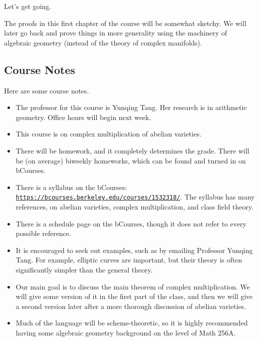 \documentclass[../notes.tex]{subfiles}
\begin{document}
Let's get going.
\begin{warn}
	The proofs in this first chapter of the course will be somewhat sketchy. We will later go back and prove things in more generality using the machinery of algebraic geometry (instead of the theory of complex manifolds).
\end{warn}

\subsection{Course Notes}
Here are some course notes.
\begin{itemize}
	\item The professor for this course is Yunqing Tang. Her research is in arithmetic geometry. Office hours will begin next week.
	\item This course is on complex multiplication of abelian varieties.
	\item There will be homework, and it completely determines the grade. There will be (on average) biweekly homeworks, which can be found and turned in on bCourses.
	\item There is a syllabus on the bCourses: \href{https://bcourses.berkeley.edu/courses/1532318/}{\texttt{https://bcourses.berkeley.edu/courses/1532318/}}. The syllabus has many references, on abelian varieties, complex multiplication, and class field theory.
	\item There is a schedule page on the bCourses, though it does not refer to every possible reference.
	\item It is encouraged to seek out examples, such as by emailing Professor Yunqing Tang. For example, elliptic curves are important, but their theory is often significantly simpler than the general theory.
	\item Our main goal is to discuss the main theorem of complex multiplication. We will give some version of it in the first part of the class, and then we will give a second version later after a more thorough discussion of abelian varieties.
	\item Much of the language will be scheme-theoretic, so it is highly recommended having some algebraic geometry background on the level of Math 256A.
\end{itemize}
\end{document}
